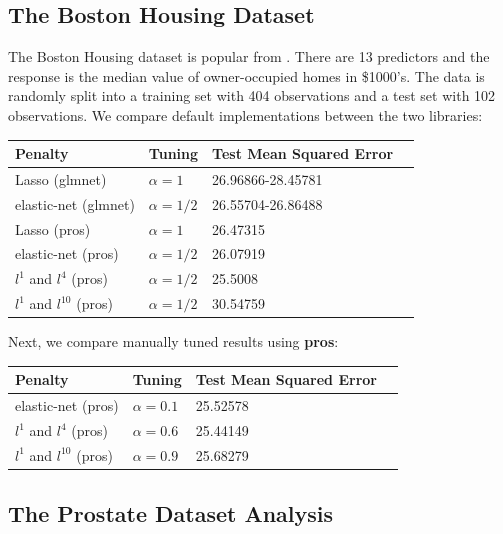 \documentclass[article]{jss}
\numberwithin{equation}{section}
\begin{document}
\subsection{The Boston Housing Dataset}

The Boston Housing dataset is popular from \cite{boston_housing}.
There are 13 predictors and the response is the median value of owner-occupied homes in \$1000's. 
The data is randomly split into a training set with 404 observations and a test set with 102 observations.
We compare default implementations between the two libraries:

\begin{center}
\setlength{\tabcolsep}{20pt} %
\renewcommand{\arraystretch}{1} %
\begin{tabular}{lllp{7.4cm}}
\hline
Penalty & Tuning & Test Mean Squared Error \\ \hline
Lasso (glmnet) & $\alpha = 1$ & 26.96866-28.45781 \\
elastic-net (glmnet) & $\alpha = 1/2$  & 26.55704-26.86488   \\
Lasso (pros) & $\alpha = 1$ &  26.47315 \\
elastic-net (pros) & $\alpha = 1/2$ &  26.07919 \\
$l^1$ and $l^{4}$ (pros) & $\alpha = 1/2$ &  25.5008 \\
$l^1$ and $l^{10}$ (pros) & $\alpha = 1/2$ &  30.54759 \\ \hline
\end{tabular}
\end{center}

Next, we compare manually tuned results using \textbf{pros}:

\begin{center}
\setlength{\tabcolsep}{20pt} %
\renewcommand{\arraystretch}{1} %
\begin{tabular}{lllp{7.4cm}}
\hline
Penalty & Tuning & Test Mean Squared Error \\ \hline
elastic-net (pros) & $\alpha = 0.1$ & 25.52578 \\
$l^1$ and $l^{4}$ (pros) & $\alpha = 0.6$ &  25.44149 \\
$l^1$ and $l^{10}$ (pros) & $\alpha = 0.9$ &  25.68279 \\ \hline
\end{tabular}
\end{center}

\subsection{The Prostate Dataset Analysis}
\end{document}
